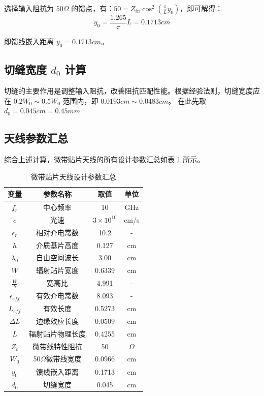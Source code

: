 \documentclass[12pt,a4paper,UTF8]{article}
\begin{document}
选择输入阻抗为 $50\Omega$ 的馈点，有：$50 = Z_{in}\cos^2(\frac{\pi}{L}y_0)$，即可解得：
$$ y_0 = \frac{1.265}{\pi}L = 0.1713 cm $$

即馈线嵌入距离 $y_0 = 0.1713 cm$。

\subsection{切缝宽度 $d_0$ 计算}

切缝的主要作用是调整输入阻抗，改善阻抗匹配性能。根据经验法则，切缝宽度应在 $0.2W_0 \sim 0.5W_0$ 范围内，即 $0.0193 cm \sim 0.0483 cm$。
在此先取$d_0 = 0.045 cm = 0.45 mm$

\subsection{天线参数汇总}

综合上述计算，微带贴片天线的所有设计参数汇总如表 \ref{tab:antenna_parameters} 所示。

\begin{table}[H]
\centering
\caption{微带贴片天线设计参数汇总}
\label{tab:antenna_parameters}
\begin{tabular}{cccc}
\hline
\textbf{变量} & \textbf{参数名称} & \textbf{取值} & \textbf{单位} \\
\hline
$f_r$ & 中心频率 & 10 & GHz \\
$c$ & 光速 & $3\times10^{10}$ & cm/s \\
$\epsilon_r$ & 相对介电常数 & 10.2 & - \\
$h$ & 介质基片高度 & 0.127 & cm \\
$\lambda_0$ & 自由空间波长 & 3.00 & cm \\
\hline
$W$ & 辐射贴片宽度 & 0.6339 & cm \\
$\frac{W}{h}$ & 宽高比 & 4.991 & - \\
$\epsilon_{eff}$ & 有效介电常数 & 8.093 & - \\
$L_{eff}$ & 有效长度 & 0.5273 & cm \\
$\Delta L$ & 边缘效应长度 & 0.0509 & cm \\
$L$ & 辐射贴片物理长度 & 0.4255 & cm \\
\hline
$Z_c$ & 微带线特性阻抗 & 50 & $\Omega$ \\
$W_0$ & 50$\Omega$微带线宽度 & 0.0966 & cm \\
\hline
$y_0$ & 馈线嵌入距离 & 0.1713 & cm \\
\hline
$d_0$ & 切缝宽度 & 0.045 & cm \\
\hline
\end{tabular}
\end{table}
\end{document}
